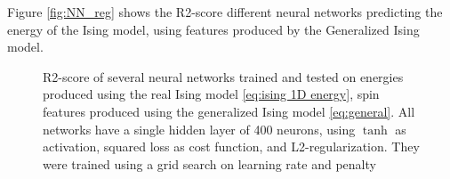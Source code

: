 Figure \autoref{fig:NN_reg} shows the R2-score different neural networks predicting the energy of the Ising model, using features produced by the Generalized Ising model.

\begin{figure}[H]
\centering
{}
\qquad
{}
\caption{R2-score of several neural networks trained and tested on energies produced using the real Ising model \autoref{eq:ising 1D energy}, spin features produced using the generalized Ising model \autoref{eq:general}. All networks have a single hidden layer of 400 neurons, using $\tanh$ as activation, squared loss as cost function, and L2-regularization. They were trained using a grid search on learning rate and penalty}
\label{fig:NN_reg}
\end{figure}

